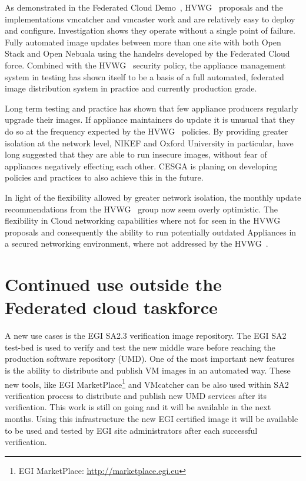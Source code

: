 \documentclass[oribibl]{llncs}
\begin{document}
As demonstrated in the Federated Cloud Demo~\cite{fedcloudemo}, HVWG~\cite{hepix} proposals and the implementations vmcatcher and vmcaster work and are relatively easy to deploy and configure. Investigation shows they operate without a single point of failure. Fully automated image updates between more than one site with both Open Stack and Open Nebuala using the handelrs developed by the Federated Cloud force. Combined with the HVWG~\cite{hepix} security policy, the appliance management system in testing has shown itself to be a basis of a full automated, federated image distribution system in practice and currently production grade.

Long term testing and practice has shown that few appliance producers regularly upgrade their images. If appliance maintainers do update it is unusual that they do so at the frequency expected by the HVWG~\cite{hepix} policies. By providing greater isolation at the network level, NIKEF and Oxford University in particular, have long suggested that they are able to run insecure images, without fear of appliances negatively effecting each other. CESGA is planing on developing policies and practices to also achieve this in the future.

In light of the flexibility allowed by greater network isolation, the monthly update recommendations from the HVWG~\cite{hepix} group now seem overly optimistic. The flexibility in Cloud networking capabilities where not for seen in the HVWG~\cite{hepix} proposals and consequently the ability to run potentially outdated Appliances in a secured networking environment, where not addressed by the HVWG~\cite{hepix}.
\section{Continued use outside the Federated cloud taskforce}
\label{sect-continued}

A new use cases is the EGI SA2.3 verification image repository. The EGI SA2 test-bed is used to verify and test the new middle ware before reaching the production software repository (UMD).
One of the most important new features is the ability to distribute and publish VM images in an automated way. 
These new tools, like EGI MarketPlace\footnote{EGI MarketPlace: \url{http://marketplace.egi.eu}} and VMcatcher can be also used within SA2 verification process to distribute and publish new UMD services after its verification. 
This work is still on going and it will be available in the next months. Using this infrastructure the new EGI certified image it will be available to be used and tested by EGI site administrators after each successful verification.
\end{document}
